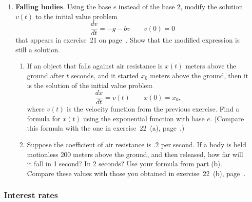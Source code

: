 \begin{enumerate}
\begin{enumerate}
  \item The per capita food supply in any year equals the ratio $F(t)/P(t)$.  What happens to this ratio as $t$ grows larger and larger?  (Use your graphs in (c) to assist your explanation.)  Do your results support Malthus's prediction?  Explain.



\end{enumerate}
\item {\bf Falling bodies}. Using the base $e$
instead of the base 2, modify the solution $v(t)$ to the initial value
problem
\[
\dfrac{dv}{dt} = -g - bv \qquad v(0) = 0
\]
that appears in exercise~21 on page~\pageref{ex:falling body1}.  Show
that the modified expression is still a solution.

  \begin{enumerate}
  \item If an object that falls against air resistance is $x(t)$ meters
above the ground after $t$ seconds, and it started $x_0$ meters above
the ground, then it is the solution of the initial value problem
\[
\dfrac{dx}{dt} = v(t) \qquad x(0) = x_0,
\]
where $v(t)$ is the velocity function from the previous exercise.
Find a formula for $x(t)$ using the exponential function with base
$e$.  (Compare this formula with the one in exercise~22~(a),
page~\pageref{ex:falling body2}.)


  \item Suppose the coefficient of air resistance is .2 per second.  If a
body is held motionless 200 meters above the ground, and then
released, how far will it fall in 1 second?  In 2 seconds?  Use your
formula from part (b).  Compare these values with those you obtained
in exercise~22~(b), page~\pageref{ex:falling body3}.

\end{enumerate}
\end{enumerate}
\subsubsection{Interest rates} 
\label{subsubsec:interest-rates}


